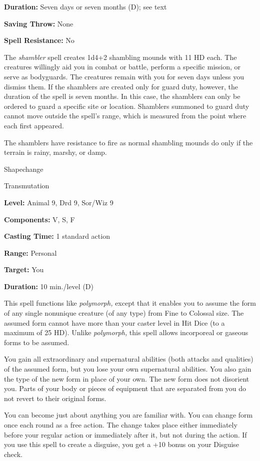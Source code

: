 \documentclass{article}
\begin{document}
\textbf{Duration:} Seven days or seven months (D); see text

\textbf{Saving Throw:} None

\textbf{Spell Resistance:} No

The \textit{shambler }spell creates 1d4+2 shambling mounds with 11 HD each. The 
creatures willingly aid you in combat or battle, perform a specific mission, or 
serve as bodyguards. The creatures remain with you for seven days unless you dismiss 
them. If the shamblers are created only for guard duty, however, the duration of 
the spell is seven months. In this case, the shamblers can only be ordered to guard 
a specific site or location. Shamblers summoned to guard duty cannot move outside 
the spell's range, which is measured from the point where each first appeared. 

The shamblers have resistance to fire as normal shambling mounds do only if the 
terrain is rainy, marshy, or damp.

\vspace{12pt}
Shapechange

Transmutation

\textbf{Level:} Animal 9, Drd 9, Sor/Wiz 9

\textbf{Components:} V, S, F

\textbf{Casting Time:} 1 standard action

\textbf{Range:} Personal

\textbf{Target:} You

\textbf{Duration:} 10 min./level (D)

This spell functions like \textit{polymorph, }except that it enables you to assume 
the form of any single nonunique creature (of any type) from Fine to Colossal size. 
The assumed form cannot have more than your caster level in Hit Dice (to a maximum 
of 25 HD). Unlike \textit{polymorph, }this spell allows incorporeal or gaseous 
forms to be assumed.

You gain all extraordinary and supernatural abilities (both attacks and qualities) 
of the assumed form, but you lose your own supernatural abilities. You also gain 
the type of the new form in place of your own. The new form does not disorient 
you. Parts of your body or pieces of equipment that are separated from you do not 
revert to their original forms.

You can become just about anything you are familiar with. You can change form once 
each round as a free action. The change takes place either immediately before your 
regular action or immediately after it, but not during the action. If you use this 
spell to create a disguise, you get a +10 bonus on your Disguise check.
\end{document}
